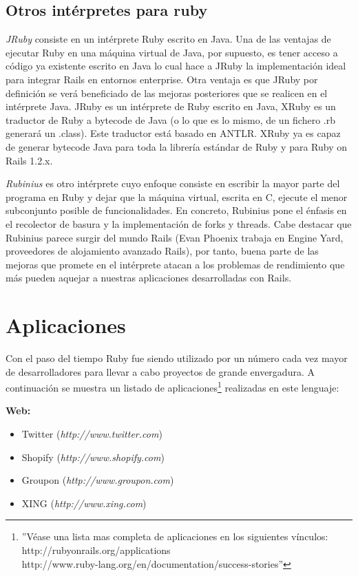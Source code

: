 \documentclass{article}
\begin{document}
\subsection{Otros intérpretes para ruby}

	\textit{JRuby} consiste en un intérprete Ruby escrito en Java. Una de las ventajas de ejecutar Ruby en una máquina virtual de Java, por supuesto, es tener acceso a código ya existente escrito en Java lo cual hace a JRuby la implementación ideal para integrar Rails en entornos enterprise. Otra ventaja es que JRuby por definición se verá beneficiado de las mejoras posteriores que se realicen en el intérprete Java. JRuby es un intérprete de Ruby escrito en Java, XRuby es un traductor de Ruby a bytecode de Java (o lo que es lo mismo, de un fichero .rb generará un .class). Este traductor está basado en ANTLR. XRuby ya es capaz de generar bytecode Java para toda la librería estándar de Ruby y para Ruby on Rails 1.2.x.
	\par
	\textit{Rubinius} es otro intérprete cuyo enfoque consiste en escribir la mayor parte del programa en Ruby y dejar que la máquina virtual, escrita en C, ejecute el menor subconjunto posible de funcionalidades. En concreto, Rubinius pone el énfasis en el recolector de basura y la implementación de forks y threads. Cabe destacar que Rubinius parece surgir del mundo Rails (Evan Phoenix trabaja en Engine Yard, proveedores de alojamiento avanzado Rails), por tanto, buena parte de las mejoras que promete en el intérprete atacan a los problemas de rendimiento que más pueden aquejar a nuestras aplicaciones desarrolladas con Rails.
\bigskip




\section{Aplicaciones}

Con el paso del tiempo Ruby fue siendo utilizado por un número cada vez mayor de desarrolladores para llevar a cabo proyectos de grande envergadura. A continuación se muestra un listado de aplicaciones\footnote{''Véase una lista mas completa de aplicaciones en los siguientes vínculos: http://rubyonrails.org/applications\\http://www.ruby-lang.org/en/documentation/success-stories''} realizadas en este lenguaje:
\bigskip\bigskip\bigskip

\textbf{Web:}
\begin{itemize}
	\itemsep=1pt \topsep=0pt \partopsep=0pt \parskip=0pt \parsep=0pt
	\item Twitter (\textit{http://www.twitter.com})
	\item Shopify (\textit{http://www.shopify.com})
	\item Groupon (\textit{http://www.groupon.com})
	\item XING (\textit{http://www.xing.com})
\end{itemize}
\medskip
\end{document}
